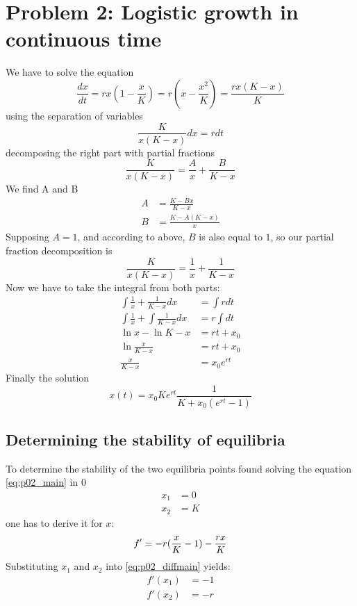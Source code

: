 \setcounter{chapter}{2}
\setcounter{section}{0}
\section{Problem 2: Logistic growth in continuous time}
We have to solve the equation
\begin{equation}
\frac{dx}{dt} = rx (1-\frac{x}{K})  = r(x - \frac{x^2}{K}) = \frac{rx(K-x)}{K}
\label{eq:p02_main}
\end{equation}
using the separation of variables
\begin{equation}
\frac{K}{x(K-x)}dx = rdt
\end{equation}
decomposing the right part with partial fractions
\begin{equation}
\frac{K}{x(K-x)}=\frac{A}{x} + \frac{B}{K-x}
\end{equation}
We find A and B
\begin{align}
A&= \frac{K - Bx}{K-x} \\
B &= \frac{K-A(K-x)}{x}
\end{align}
Supposing $A = 1$, and according to above, $B$ is also equal to $1$, so our partial fraction decomposition is
\begin{equation}
\frac{K}{x(K-x)}=\frac{1}{x} + \frac{1}{K-x}
\end{equation}
Now we have to take the integral from both parts:
\begin{align}
\int{\frac{1}{x}+\frac{1}{K-x}dx} &= \int{rdt}\\
\int{\frac{1}{x}}+\int{\frac{1}{K-x}dx} &= r\int{dt}\\
\ln{x} - \ln{K-x} &= rt + x_0\\
\ln{\frac{x}{K-x}} &= rt + x_0\\
\frac{x}{K-x} &= x_0e^{rt}
\end{align}
Finally the solution 
\begin{equation}
x(t) = x_0Ke^{rt}\frac{1}{K + x_0(e^{rt}-1)}
\end{equation}

\subsection{Determining the stability of equilibria}

To determine the stability of the two equilibria points found solving the equation \ref{eq:p02_main} in $0$
\begin{align}
x_1 &= 0\\
x_2 &= K
\end{align}
one has to derive it for $x$:
\begin{equation}
f' = - r(\frac{x}{K} - 1) - \frac{rx}{K}\\
\label{eq:p02_diffmain}
\end{equation}
Substituting $x_1$ and $x_2$ into \ref{eq:p02_diffmain} yields:
\begin{align}
f'(x_1) &= -1 \\
f'(x_2) &= -r
\end{align}

